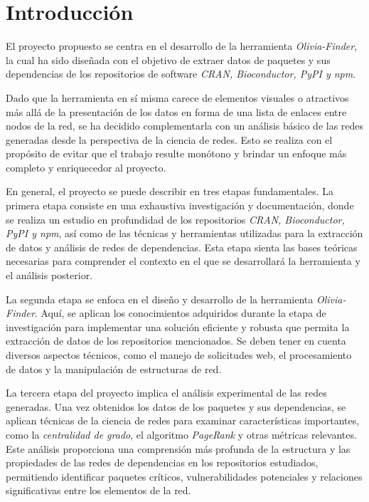 
\section{Introducción}

El proyecto propuesto se centra en el desarrollo de la herramienta \textit{Olivia-Finder}, 
la cual ha sido diseñada con el objetivo de extraer datos de paquetes y sus dependencias de 
los repositorios de software \textit{CRAN, Bioconductor, PyPI y npm}. 

Dado que la herramienta en sí misma carece de elementos visuales o atractivos más allá 
de la presentación de los datos en forma de una lista de enlaces entre nodos de la red, 
se ha decidido complementarla con un análisis básico de las redes generadas desde la perspectiva 
de la ciencia de redes. Esto se realiza con el propósito de evitar que el trabajo resulte monótono 
y brindar un enfoque más completo y enriquecedor al proyecto.

En general, el proyecto se puede describir en tres etapas fundamentales. 
La primera etapa consiste en una exhaustiva investigación y documentación, donde se realiza un estudio 
en profundidad de los repositorios \textit{CRAN, Bioconductor, PyPI y npm}, así como de las técnicas y herramientas 
utilizadas para la extracción de datos y análisis de redes de dependencias. Esta etapa sienta las bases teóricas 
necesarias para comprender el contexto en el que se desarrollará la herramienta y el análisis posterior.

La segunda etapa se enfoca en el diseño y desarrollo de la herramienta \textit{Olivia-Finder}. 
Aquí, se aplican los conocimientos adquiridos durante la etapa de investigación para implementar una solución 
eficiente y robusta que permita la extracción de datos de los repositorios mencionados. 
Se deben tener en cuenta diversos aspectos técnicos, como el manejo de solicitudes web, el procesamiento de datos 
y la manipulación de estructuras de red.

La tercera etapa del proyecto implica el análisis experimental de las redes generadas. 
Una vez obtenidos los datos de los paquetes y sus dependencias, se aplican técnicas de la ciencia de redes 
para examinar características importantes, como la \textit{centralidad de grado}, el algoritmo \textit{PageRank} y 
otras métricas relevantes. Este análisis proporciona una comprensión más profunda de la estructura 
y las propiedades de las redes de dependencias en los repositorios estudiados, permitiendo identificar 
paquetes críticos, vulnerabilidades potenciales y relaciones significativas entre los elementos de la red.

